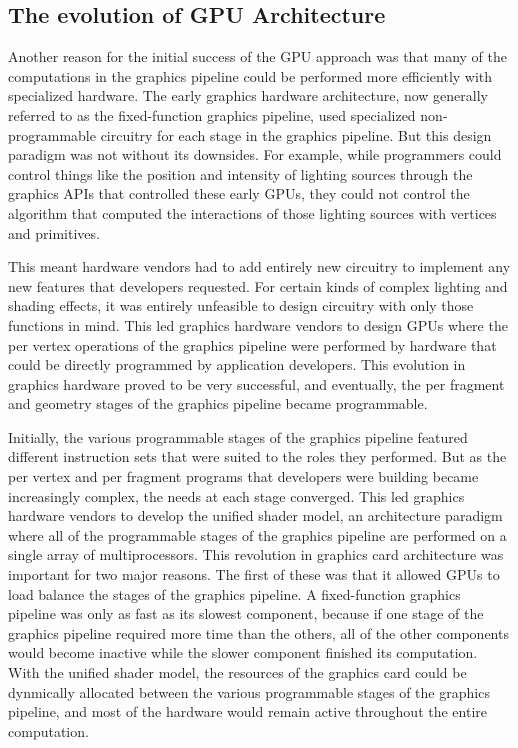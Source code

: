 \documentclass[12pt,twoside]{reedthesis}
\begin{document}
\subsection{The evolution of GPU Architecture}

Another reason for the initial success of the GPU approach was that many of the computations in the graphics pipeline could be performed more efficiently with specialized hardware. The early graphics hardware architecture, now generally referred to as the fixed-function graphics pipeline, used specialized non-programmable circuitry for each stage in the graphics pipeline. But this design paradigm was not without its downsides. For example, while programmers could control things like the position and intensity of lighting sources through the graphics APIs that controlled these early GPUs, they could not control the algorithm that computed the interactions of those lighting sources with vertices and primitives.

This meant hardware vendors had to add entirely new circuitry to implement any new features that developers requested. For certain kinds of complex lighting and shading effects, it was entirely unfeasible to design circuitry with only those functions in mind. This led graphics hardware vendors to design GPUs where the per vertex operations of the graphics pipeline were performed by hardware that could be directly programmed by application developers. This evolution in graphics hardware proved to be very successful, and eventually, the per fragment and geometry stages of the graphics pipeline became programmable.

Initially, the various programmable stages of the graphics pipeline featured different instruction sets that were suited to the roles they performed. But as the per vertex and per fragment programs that developers were building became increasingly complex, the needs at each stage converged. This led graphics hardware vendors to develop the unified shader model, an architecture paradigm where all of the programmable stages of the graphics pipeline are performed on a single array of multiprocessors. This revolution in graphics card architecture was important for two major reasons. The first of these was that it allowed GPUs to load balance the stages of the graphics pipeline. A fixed-function graphics pipeline was only as fast as its slowest component, because if one stage of the graphics pipeline required more time than the others, all of the other components would become inactive while the slower component finished its computation. With the unified shader model, the resources of the graphics card could be dynmically allocated between the various programmable stages of the graphics pipeline, and most of the hardware would remain active throughout the entire computation.
\end{document}
